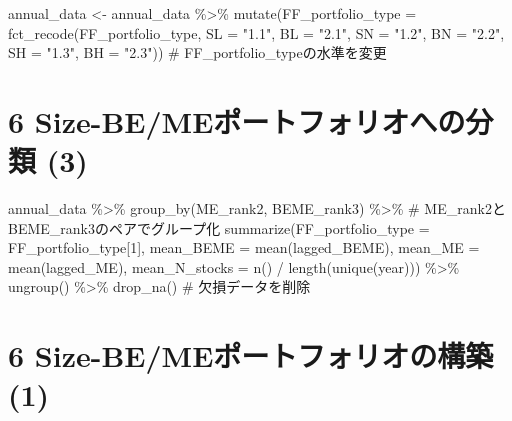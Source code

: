 \documentclass[
  letterpaper,
  DIV=11,
  numbers=noendperiod]{scrreprt}
\newenvironment{Shaded}{\begin{snugshade}}{\end{snugshade}}
\newcommand{\AttributeTok}[1]{\textcolor[rgb]{0.40,0.45,0.13}{#1}}
\newcommand{\CommentTok}[1]{\textcolor[rgb]{0.37,0.37,0.37}{#1}}
\newcommand{\DecValTok}[1]{\textcolor[rgb]{0.68,0.00,0.00}{#1}}
\newcommand{\FunctionTok}[1]{\textcolor[rgb]{0.28,0.35,0.67}{#1}}
\newcommand{\NormalTok}[1]{\textcolor[rgb]{0.00,0.23,0.31}{#1}}
\newcommand{\OtherTok}[1]{\textcolor[rgb]{0.00,0.23,0.31}{#1}}
\newcommand{\SpecialCharTok}[1]{\textcolor[rgb]{0.37,0.37,0.37}{#1}}
\newcommand{\StringTok}[1]{\textcolor[rgb]{0.13,0.47,0.30}{#1}}
\begin{document}
\begin{Shaded}
\begin{Highlighting}[]
\NormalTok{annual\_data }\OtherTok{\textless{}{-}}\NormalTok{ annual\_data }\SpecialCharTok{\%\textgreater{}\%}
  \FunctionTok{mutate}\NormalTok{(}\AttributeTok{FF\_portfolio\_type =} \FunctionTok{fct\_recode}\NormalTok{(FF\_portfolio\_type, }
                                        \AttributeTok{SL =} \StringTok{"1.1"}\NormalTok{,}
                                        \AttributeTok{BL =} \StringTok{"2.1"}\NormalTok{,}
                                        \AttributeTok{SN =} \StringTok{"1.2"}\NormalTok{,}
                                        \AttributeTok{BN =} \StringTok{"2.2"}\NormalTok{,}
                                        \AttributeTok{SH =} \StringTok{"1.3"}\NormalTok{,}
                                        \AttributeTok{BH =} \StringTok{"2.3"}\NormalTok{)) }\CommentTok{\# FF\_portfolio\_typeの水準を変更}
\end{Highlighting}
\end{Shaded}

\section{6 Size-BE/MEポートフォリオへの分類
(3)}\label{size-bemeux30ddux30fcux30c8ux30d5ux30a9ux30eaux30aaux3078ux306eux5206ux985e-3}

\begin{Shaded}
\begin{Highlighting}[]
\NormalTok{annual\_data }\SpecialCharTok{\%\textgreater{}\%} 
  \FunctionTok{group\_by}\NormalTok{(ME\_rank2, BEME\_rank3) }\SpecialCharTok{\%\textgreater{}\%} \CommentTok{\# ME\_rank2とBEME\_rank3のペアでグループ化}
  \FunctionTok{summarize}\NormalTok{(}\AttributeTok{FF\_portfolio\_type =}\NormalTok{ FF\_portfolio\_type[}\DecValTok{1}\NormalTok{],}
            \AttributeTok{mean\_BEME =} \FunctionTok{mean}\NormalTok{(lagged\_BEME),}
            \AttributeTok{mean\_ME =} \FunctionTok{mean}\NormalTok{(lagged\_ME),}
            \AttributeTok{mean\_N\_stocks =} \FunctionTok{n}\NormalTok{() }\SpecialCharTok{/} \FunctionTok{length}\NormalTok{(}\FunctionTok{unique}\NormalTok{(year))) }\SpecialCharTok{\%\textgreater{}\%}
  \FunctionTok{ungroup}\NormalTok{() }\SpecialCharTok{\%\textgreater{}\%}
  \FunctionTok{drop\_na}\NormalTok{() }\CommentTok{\# 欠損データを削除}
\end{Highlighting}
\end{Shaded}

\section{6 Size-BE/MEポートフォリオの構築
(1)}\label{size-bemeux30ddux30fcux30c8ux30d5ux30a9ux30eaux30aaux306eux69cbux7bc9-1}
\end{document}
